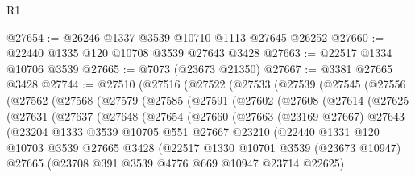 \begin{lexlean}{R1}
\begin{coremodule}
@27654 := @26246 @1337 @3539 @10710 @1113 @27645 @26252
@27660 := @22440 @1335 @120 @10708 @3539 @27643 @3428
@27663 := @22517 @1334 @10706 @3539
@27665 := @7073 (@23673 @21350)
@27667 := @3381 @27665 @3428
@27744 := @27510
    (@27516
      (@27522
        (@27533
          (@27539
            (@27545
              (@27556
                (@27562
                  (@27568
                    (@27579
                      (@27585
                        (@27591
                          (@27602
                            (@27608
                              (@27614
                                (@27625
                                  (@27631
                                    (@27637
                                      (@27648
                                        (@27654
                                          (@27660
                                            (@27663
                                              (@23169 @27667)
                                              @27643
                                              (@23204
                                                @1333
                                                @3539
                                                @10705
                                                @551
                                                @27667
                                                @23210
                                                (@22440
                                                  @1331
                                                  @120
                                                  @10703
                                                  @3539
                                                  @27665
                                                  @3428
                                                  (@22517
                                                    @1330
                                                    @10701
                                                    @3539
                                                    (@23673 @10947)
                                                    @27665
                                                    (@23708
                                                      @391
                                                      @3539
                                                      @4776
                                                      @669
                                                      @10947
                                                      @23714
                                                      @22625)

\end{coremodule}
\end{lexlean}
